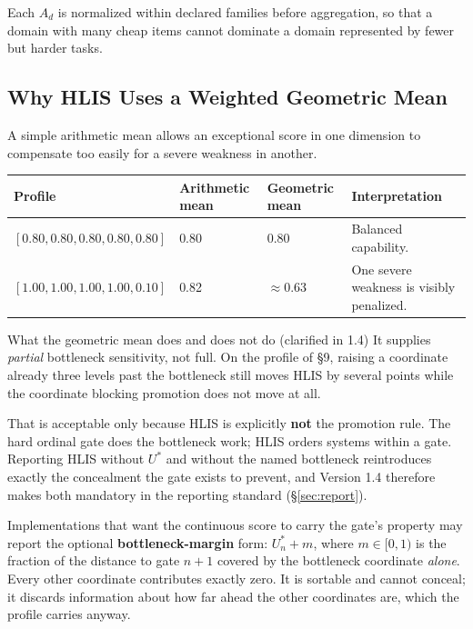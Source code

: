\documentclass[11pt]{article}
\theoremstyle{definition}
\begin{document}
Each $A_d$ is normalized within declared families before aggregation, so that a domain with many cheap items cannot dominate a domain represented by fewer but harder tasks.

\subsection{Why HLIS Uses a Weighted Geometric Mean}

A simple arithmetic mean allows an exceptional score in one dimension to compensate too easily for a severe weakness in another.

\begin{table}[h]
\centering\small
\begin{tabularx}{\textwidth}{@{}lllY@{}}
\toprule
Profile & Arithmetic mean & Geometric mean & Interpretation \\
\midrule
$[0.80,0.80,0.80,0.80,0.80]$ & 0.80 & 0.80 & Balanced capability. \\
$[1.00,1.00,1.00,1.00,0.10]$ & 0.82 & $\approx$0.63 & One severe weakness is visibly penalized. \\
\bottomrule
\end{tabularx}
\end{table}

\begin{cautionbox}{What the geometric mean does and does not do (clarified in 1.4)}
It supplies \emph{partial} bottleneck sensitivity, not full. On the profile of \S9, raising a coordinate already three levels past the bottleneck still moves HLIS by several points while the coordinate blocking promotion does not move at all.

That is acceptable only because HLIS is explicitly \textbf{not} the promotion rule. The hard ordinal gate does the bottleneck work; HLIS orders systems within a gate. Reporting HLIS without $U^{*}$ and without the named bottleneck reintroduces exactly the concealment the gate exists to prevent, and Version 1.4 therefore makes both mandatory in the reporting standard (\S\ref{sec:report}).

Implementations that want the continuous score to carry the gate's property may report the optional \textbf{bottleneck-margin} form: $U^{*}_n + m$, where $m \in [0,1)$ is the fraction of the distance to gate $n{+}1$ covered by the bottleneck coordinate \emph{alone}. Every other coordinate contributes exactly zero. It is sortable and cannot conceal; it discards information about how far ahead the other coordinates are, which the profile carries anyway.
\end{cautionbox}
\end{document}
